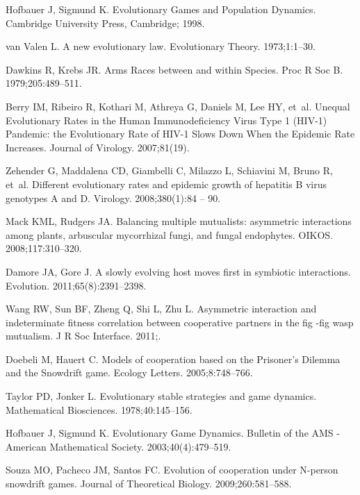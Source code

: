 \documentclass[aps,pre,amsfonts,floatfix, onecolumn,showkeys]{revtex4-1}
\begin{document}
\begin{thebibliography}{10}
Hofbauer J, Sigmund K.
\newblock Evolutionary Games and Population Dynamics.
\newblock Cambridge University Press, Cambridge; 1998.

van Valen L.
\newblock A new evolutionary law.
\newblock Evolutionary Theory. 1973;1:1--30.

Dawkins R, Krebs JR.
\newblock Arms Races between and within Species.
\newblock Proc R Soc B. 1979;205:489--511.

Berry IM, Ribeiro R, Kothari M, Athreya G, Daniels M, Lee HY, et~al.
\newblock Unequal Evolutionary Rates in the Human Immunodeficiency Virus Type 1
  (HIV-1) Pandemic: the Evolutionary Rate of HIV-1 Slows Down When the Epidemic
  Rate Increases.
\newblock Journal of Virology. 2007;81(19).

Zehender G, Maddalena CD, Giambelli C, Milazzo L, Schiavini M, Bruno R, et~al.
\newblock Different evolutionary rates and epidemic growth of hepatitis B virus
  genotypes A and D.
\newblock Virology. 2008;380(1):84 -- 90.

Mack KML, Rudgers JA.
\newblock Balancing multiple mutualists: asymmetric interactions among plants,
  arbuscular mycorrhizal fungi, and fungal endophytes.
\newblock OIKOS. 2008;117:310--320.

Damore JA, Gore J.
\newblock A slowly evolving host moves first in symbiotic interactions.
\newblock Evolution. 2011;65(8):2391--2398.

Wang RW, Sun BF, Zheng Q, Shi L, Zhu L.
\newblock Asymmetric interaction and indeterminate fitness correlation between
  cooperative partners in the fig -fig wasp mutualism.
\newblock J R Soc Interface. 2011;.

Doebeli M, Hauert C.
\newblock Models of cooperation based on the Prisoner's Dilemma and the
  Snowdrift game.
\newblock Ecology Letters. 2005;8:748--766.

Taylor PD, Jonker L.
\newblock Evolutionary stable strategies and game dynamics.
\newblock Mathematical Biosciences. 1978;40:145--156.

Hofbauer J, Sigmund K.
\newblock Evolutionary Game Dynamics.
\newblock Bulletin of the AMS - American Mathematical Society.
  2003;40(4):479--519.

Souza MO, Pacheco JM, Santos FC.
\newblock Evolution of cooperation under N-person snowdrift games.
\newblock Journal of Theoretical Biology. 2009;260:581--588.


\end{thebibliography}
\end{document}
